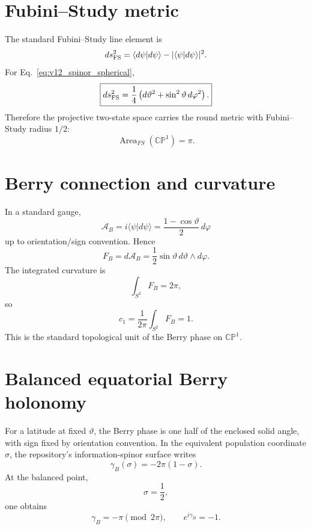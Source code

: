 \section{Fubini--Study metric}

The standard Fubini--Study line element is
\begin{equation}
ds_{\rm FS}^2
=
\langle d\psi|d\psi\rangle
-
|\langle\psi|d\psi\rangle|^2.
\end{equation}
For Eq.~\eqref{eq:v12_spinor_spherical},
\begin{equation}
\boxed{
ds_{\rm FS}^2
=
\frac14
\left(
d\vartheta^2+\sin^2\vartheta\,d\varphi^2
\right).
}
\label{eq:v12_fs_qubit}
\end{equation}
Therefore the projective two-state space carries the round metric with Fubini--Study radius $1/2$:
\begin{equation}
\boxed{
\operatorname{Area}_{FS}(\mathbb{CP}^1)=\pi.
}
\end{equation}

\section{Berry connection and curvature}

In a standard gauge,
\begin{equation}
\mathcal A_B
=
i\langle\psi|d\psi\rangle
=
\frac{1-\cos\vartheta}{2}\,d\varphi
\end{equation}
up to orientation/sign convention. Hence
\begin{equation}
\boxed{
F_B=d\mathcal A_B
=
\frac12
\sin\vartheta\,d\vartheta\wedge d\varphi.
}
\label{eq:v12_berry_curvature}
\end{equation}
The integrated curvature is
\begin{equation}
\int_{S^2}F_B=2\pi,
\end{equation}
so
\begin{equation}
\boxed{
c_1
=
\frac1{2\pi}\int_{S^2}F_B
=
1.
}
\label{eq:v12_chern_one}
\end{equation}
This is the standard topological unit of the Berry phase on $\mathbb{CP}^1$.

\section{Balanced equatorial Berry holonomy}

For a latitude at fixed $\vartheta$, the Berry phase is one half of the enclosed solid angle, with sign fixed by orientation convention. In the equivalent population coordinate $\sigma$, the repository's information-spinor surface writes
\begin{equation}
\gamma_B(\sigma)
=
-2\pi(1-\sigma).
\end{equation}
At the balanced point,
\begin{equation}
\sigma=\frac12,
\end{equation}
one obtains
\begin{equation}
\boxed{
\gamma_B=-\pi\pmod{2\pi},
\qquad
e^{i\gamma_B}=-1.
}
\label{eq:v12_balanced_berry_sign}
\end{equation}

